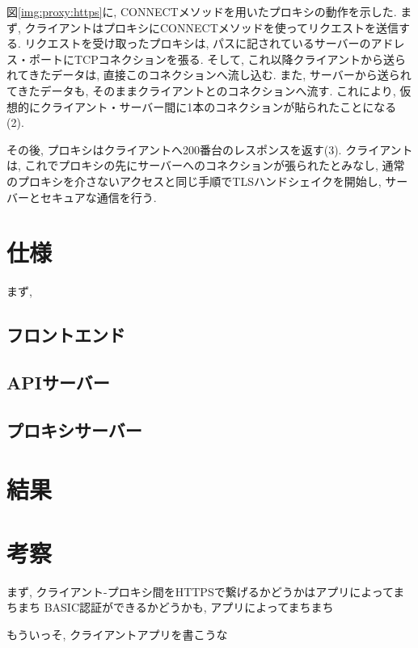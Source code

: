 \documentclass[a4paper,uplatex,a4j,dvipdfmx]{jsarticle}
\begin{document}
\begin{multicols}{2}
    図\ref{img:proxy:https}に, CONNECTメソッドを用いたプロキシの動作を示した.
    まず, クライアントはプロキシにCONNECTメソッドを使ってリクエストを送信する.
    リクエストを受け取ったプロキシは, パスに記されているサーバーのアドレス・ポートにTCPコネクションを張る. そして, これ以降クライアントから送られてきたデータは, 直接このコネクションへ流し込む. また, サーバーから送られてきたデータも, そのままクライアントとのコネクションへ流す.
    これにより, 仮想的にクライアント・サーバー間に1本のコネクションが貼られたことになる(2).
    
    その後, プロキシはクライアントへ200番台のレスポンスを返す(3).
    クライアントは, これでプロキシの先にサーバーへのコネクションが張られたとみなし, 通常のプロキシを介さないアクセスと同じ手順でTLSハンドシェイクを開始し, サーバーとセキュアな通信を行う.

    \section{仕様}
    
    まず, 
    
    \subsection{フロントエンド}
    
    \subsection{APIサーバー}
    
    \subsection{プロキシサーバー}
    
    

    \section{結果}

    \section{考察}
    
    まず, クライアント-プロキシ間をHTTPSで繋げるかどうかはアプリによってまちまち
    BASIC認証ができるかどうかも, アプリによってまちまち
    
    もういっそ, クライアントアプリを書こうな
    

\end{multicols}
\end{document}
